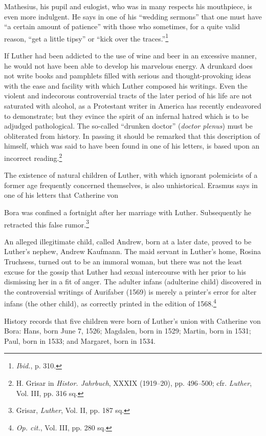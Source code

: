Mathesius, his pupil and eulogist, who was in many respects his
mouthpiece, is even more indulgent. He says in one of his ``wedding
sermons'' that one must have “a certain amount of patience” with
those who sometimes, for a quite valid reason, “get a little tipsy”
or “kick over the traces.”\footnote{\textit{Ibid.}, p. 310.}


If Luther had been addicted to the use of wine and beer in an
excessive manner, he would not have been able to develop his marvelous
energy. A drunkard does not write books and pamphlets filled
with serious and thought-provoking ideas with the ease and facility with
which Luther composed his writings. Even the violent and indecorous
controversial tracts of the later period of his life are not saturated
with alcohol, as a Protestant writer in America has recently endeavored
to demonstrate; but they evince the spirit of an infernal hatred
which is to be adjudged pathological. The so-called “drunken doctor”
(\textit{doctor plenus}) must be obliterated from history. In passing
it should be remarked that this description of himself, which was
said to have been found in one of his letters, is based upon an incorrect
reading.\footnote{H. Grisar in \textit{Histor. Jahrbuch}, XXXIX (1919--20), pp. 496--500; cfr. \textit{Luther}, Vol. III,
pp. 316 sq.}

The existence of natural children of Luther, with which ignorant
polemicists of a former age frequently concerned themselves, is also
unhistorical. Erasmus says in one of his letters that Catherine von

Bora was confined a fortnight after her marriage with Luther. Subsequently
he retracted this false rumor.\footnote{Grisar, \textit{Luther}, Vol. II, pp. 187 sq.}

An alleged illegitimate child,
called Andrew, born at a later date, proved to be Luther’s nephew,
Andrew Kaufmann. The maid servant in Luther’s home, Rosina
Truchsess, turned out to be an immoral woman, but there was not
the least excuse for the gossip that Luther had sexual intercourse
with her prior to his dismissing her in a fit of anger. The adulter
infans (adulterine child) discovered in the controversial writings
of Aurifaber (1569) is merely a printer’s error for alter infans
(the other child), as correctly printed in the edition of 1568.\footnote{\textit{Op. cit.}, Vol. III, pp. 280 sq.}


History records that five children were born of Luther’s union with
Catherine von Bora: Hans, born June 7, 1526; Magdalen, born in
1529; Martin, born in 1531; Paul, born in 1533; and Margaret,
born in 1534.

